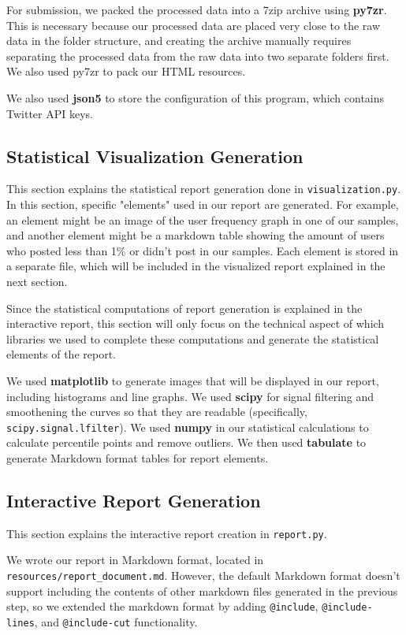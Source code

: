 \documentclass{article}
\begin{document}
    For submission, we packed the processed data into a 7zip archive using \textbf{py7zr}. This is necessary because our processed data are placed very close to the raw data in the folder structure, and creating the archive manually requires separating the processed data from the raw data into two separate folders first. We also used py7zr to pack our HTML resources.

    We also used \textbf{json5} to store the configuration of this program, which contains Twitter API keys.

    \subsection*{Statistical Visualization Generation}
    \indent

    This section explains the statistical report generation done in \verb|visualization.py|. In this section, specific "elements" used in our report are generated. For example, an element might be an image of the user frequency graph in one of our samples, and another element might be a markdown table showing the amount of users who posted less than 1\% or didn't post in our samples. Each element is stored in a separate file, which will be included in the visualized report explained in the next section.

    Since the statistical computations of report generation is explained in the interactive report, this section will only focus on the technical aspect of which libraries we used to complete these computations and generate the statistical elements of the report.

    We used \textbf{matplotlib} to generate images that will be displayed in our report, including histograms and line graphs. We used \textbf{scipy} for signal filtering and smoothening the curves so that they are readable (specifically, \verb|scipy.signal.lfilter|). We used \textbf{numpy} in our statistical calculations to calculate percentile points and remove outliers. We then used \textbf{tabulate} to generate Markdown format tables for report elements.

    \subsection*{Interactive Report Generation}
    \indent

    This section explains the interactive report creation in \verb|report.py|.

    We wrote our report in Markdown format, located in \verb|resources/report_document.md|. However, the default Markdown format doesn't support including the contents of other markdown files generated in the previous step, so we extended the markdown format by adding \verb|@include|, \verb|@include-lines|, and \verb|@include-cut| functionality.
\end{document}
